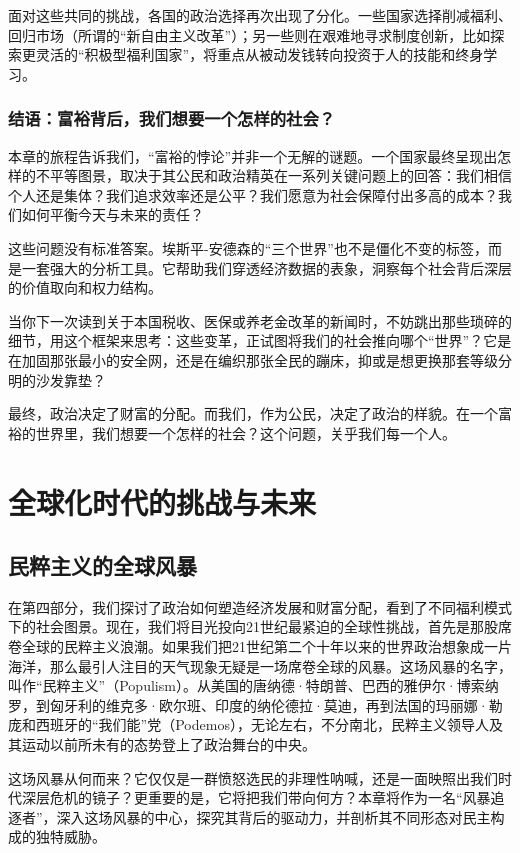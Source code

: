\documentclass[a5paper, 11pt, openany]{ctexbook}
\begin{document}
面对这些共同的挑战，各国的政治选择再次出现了分化。一些国家选择削减福利、回归市场（所谓的“新自由主义改革”）；另一些则在艰难地寻求制度创新，比如探索更灵活的“积极型福利国家”，将重点从被动发钱转向投资于人的技能和终身学习。

\section*{结语：富裕背后，我们想要一个怎样的社会？}

本章的旅程告诉我们，“富裕的悖论”并非一个无解的谜题。一个国家最终呈现出怎样的不平等图景，取决于其公民和政治精英在一系列关键问题上的回答：我们相信个人还是集体？我们追求效率还是公平？我们愿意为社会保障付出多高的成本？我们如何平衡今天与未来的责任？

这些问题没有标准答案。埃斯平-安德森的“三个世界”也不是僵化不变的标签，而是一套强大的分析工具。它帮助我们穿透经济数据的表象，洞察每个社会背后深层的价值取向和权力结构。

当你下一次读到关于本国税收、医保或养老金改革的新闻时，不妨跳出那些琐碎的细节，用这个框架来思考：这些变革，正试图将我们的社会推向哪个“世界”？它是在加固那张最小的安全网，还是在编织那张全民的蹦床，抑或是想更换那套等级分明的沙发靠垫？

最终，政治决定了财富的分配。而我们，作为公民，决定了政治的样貌。在一个富裕的世界里，我们想要一个怎样的社会？这个问题，关乎我们每一个人。


\part{全球化时代的挑战与未来}

\chapter{民粹主义的全球风暴}

在第四部分，我们探讨了政治如何塑造经济发展和财富分配，看到了不同福利模式下的社会图景。现在，我们将目光投向21世纪最紧迫的全球性挑战，首先是那股席卷全球的民粹主义浪潮。如果我们把21世纪第二个十年以来的世界政治想象成一片海洋，那么最引人注目的天气现象无疑是一场席卷全球的风暴。这场风暴的名字，叫作“民粹主义”（Populism）。从美国的唐纳德·特朗普、巴西的雅伊尔·博索纳罗，到匈牙利的维克多·欧尔班、印度的纳伦德拉·莫迪，再到法国的玛丽娜·勒庞和西班牙的“我们能”党（Podemos），无论左右，不分南北，民粹主义领导人及其运动以前所未有的态势登上了政治舞台的中央。

这场风暴从何而来？它仅仅是一群愤怒选民的非理性呐喊，还是一面映照出我们时代深层危机的镜子？更重要的是，它将把我们带向何方？本章将作为一名“风暴追逐者”，深入这场风暴的中心，探究其背后的驱动力，并剖析其不同形态对民主构成的独特威胁。
\end{document}
